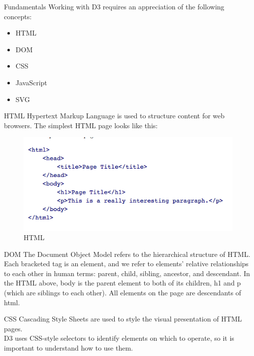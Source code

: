 \documentclass{beamer}
\begin{document}
\begin{frame}{Fundamentals} 
Working with D3 requires an appreciation of the following concepts:

\begin{itemize}
	\item HTML 
	\item DOM
	\item CSS
	\item JavaScript
	\item SVG
\end{itemize}
\end{frame}

\begin{frame}{HTML}
Hypertext Markup Language is used to structure content for web browsers. The simplest HTML page looks like this:
\begin{figure}
\centering
\includegraphics[width=1.0\textwidth]{./images/HTML.png}
\caption{\label{fig:samplemax} HTML}
\end{figure}
\end{frame}

\begin{frame}{DOM}
The Document Object Model refers to the hierarchical structure of HTML. Each bracketed tag is an element, and we refer to elements' relative relationships to each other in human terms: parent, child, sibling, ancestor, and descendant. In the HTML above, body is the parent element to both of its children, h1 and p (which are siblings to each other). All elements on the page are descendants of html.
\end{frame}

\begin{frame}{CSS}
Cascading Style Sheets are used to style the visual presentation of HTML pages.
\newline \\
D3 uses CSS-style selectors to identify elements on which to operate, so it is important to understand how to use them.
\end{frame}
\end{document}
